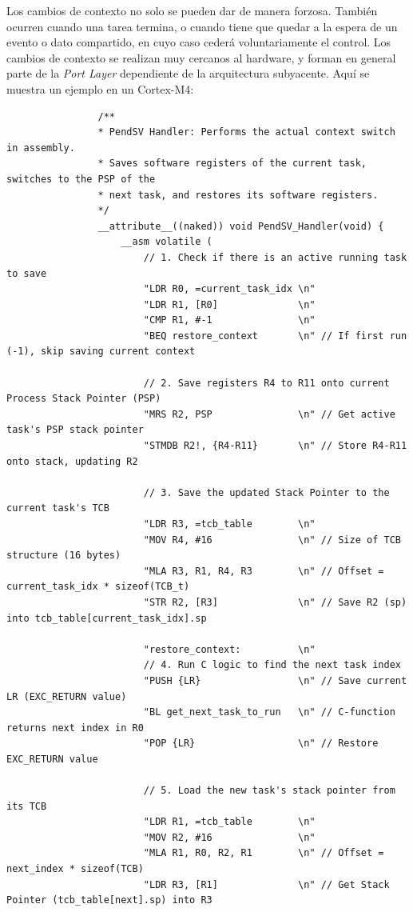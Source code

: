 \documentclass[../main.tex]{subfiles}
\begin{document}
            Los cambios de contexto no solo se pueden dar de manera forzosa. También ocurren cuando una tarea termina, o cuando tiene que quedar a la espera de un evento o dato compartido, en cuyo caso cederá voluntariamente el control. Los cambios de contexto se realizan muy cercanos al hardware, y forman en general parte de la \emph{Port Layer} dependiente de la arquitectura subyacente. Aquí se muestra un ejemplo en un Cortex-M4:

            \begin{lstlisting}
                /**
                * PendSV Handler: Performs the actual context switch in assembly.
                * Saves software registers of the current task, switches to the PSP of the
                * next task, and restores its software registers.
                */
                __attribute__((naked)) void PendSV_Handler(void) {
                    __asm volatile (
                        // 1. Check if there is an active running task to save
                        "LDR R0, =current_task_idx \n"
                        "LDR R1, [R0]              \n"
                        "CMP R1, #-1               \n"
                        "BEQ restore_context       \n" // If first run (-1), skip saving current context

                        // 2. Save registers R4 to R11 onto current Process Stack Pointer (PSP)
                        "MRS R2, PSP               \n" // Get active task's PSP stack pointer
                        "STMDB R2!, {R4-R11}       \n" // Store R4-R11 onto stack, updating R2

                        // 3. Save the updated Stack Pointer to the current task's TCB
                        "LDR R3, =tcb_table        \n"
                        "MOV R4, #16               \n" // Size of TCB structure (16 bytes)
                        "MLA R3, R1, R4, R3        \n" // Offset = current_task_idx * sizeof(TCB_t)
                        "STR R2, [R3]              \n" // Save R2 (sp) into tcb_table[current_task_idx].sp

                        "restore_context:          \n"
                        // 4. Run C logic to find the next task index
                        "PUSH {LR}                 \n" // Save current LR (EXC_RETURN value)
                        "BL get_next_task_to_run   \n" // C-function returns next index in R0
                        "POP {LR}                  \n" // Restore EXC_RETURN value

                        // 5. Load the new task's stack pointer from its TCB
                        "LDR R1, =tcb_table        \n"
                        "MOV R2, #16               \n"
                        "MLA R1, R0, R2, R1        \n" // Offset = next_index * sizeof(TCB)
                        "LDR R3, [R1]              \n" // Get Stack Pointer (tcb_table[next].sp) into R3


\end{lstlisting}
\end{document}
